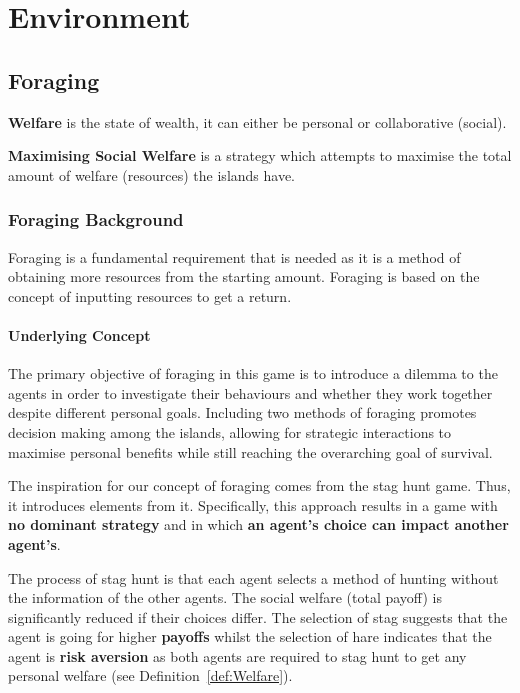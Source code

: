 \chapter{Environment}
\section{Foraging}

\begin{definition} \label{def:Welfare}
\textbf{Welfare} is the state of wealth, it can either be personal or collaborative (social).
\end{definition}

\begin{definition} \label{def:Maximising Social Welfare}
\textbf{Maximising Social Welfare} is a strategy which attempts to maximise the total amount of welfare (resources) the islands have.
\end{definition}


\subsection{Foraging Background}

Foraging is a fundamental requirement that is needed as it is a method of obtaining more resources from the starting amount. Foraging is based on the concept of inputting resources to get a return.

\subsubsection{Underlying Concept}

The primary objective of foraging in this game is to introduce a dilemma to the agents in order to investigate their behaviours and whether they work together despite different personal goals. Including two methods of foraging promotes decision making among the islands, allowing for strategic interactions to maximise personal benefits while still reaching the overarching goal of survival. 

The inspiration for our concept of foraging comes from the stag hunt game. Thus, it introduces elements from it. Specifically, this approach results in a game with \textbf{no dominant strategy} and in which \textbf{an agent's choice can impact another agent's}.

The process of stag hunt is that each agent selects a method of hunting without the information of the other agents. The social welfare (total payoff) is significantly reduced if their choices differ. The selection of stag suggests that the agent is going for higher \textbf{payoffs} whilst the selection of hare indicates that the agent is \textbf{risk aversion} as both agents are required to stag hunt to get any personal welfare (see Definition~\ref{def:Welfare}).


